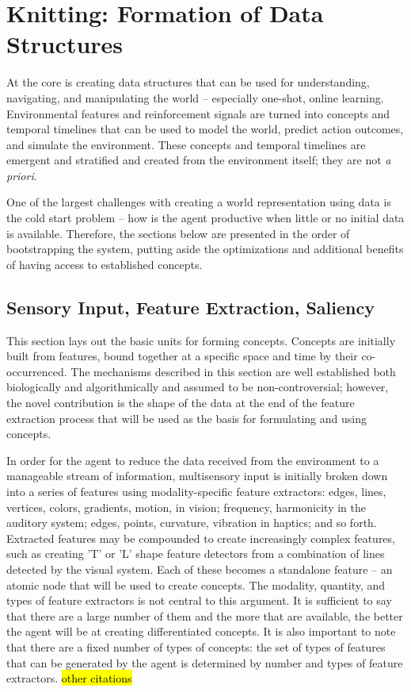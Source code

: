 \documentclass{article}
\begin{document}
\section{Knitting: Formation of Data Structures}
At the core is creating data structures that can be used for understanding, navigating, and manipulating the world -- especially one-shot, online learning. Environmental features and reinforcement signals are turned into concepts and temporal timelines that can be used to model the world, predict action outcomes, and simulate the environment. These concepts and temporal timelines are emergent and stratified and created from the environment itself; they are not \emph{a priori}.

One of the largest challenges with creating a world representation using data is the cold start problem -- how is the agent productive when little or no initial data is available. Therefore, the sections below are presented in the order of bootstrapping the system, putting aside the optimizations and additional benefits of having access to established concepts.

\subsection{Sensory Input, Feature Extraction, Saliency}
This section lays out the basic units for forming concepts. Concepts are initially built from features, bound together at a specific space and time by their co-occurrenced. The mechanisms described in this section are well established both biologically and algorithmically and assumed to be non-controversial; however, the novel contribution is the shape of the data at the end of the feature extraction process that will be used as the basis for formulating and using concepts.

In order for the agent to reduce the data received from the environment to a manageable stream of information, multisensory input is initially broken down into a series of features using modality-specific feature extractors: edges, lines, vertices, colors, gradients, motion, in vision; frequency, harmonicity in the auditory system; edges, points, curvature, vibration in haptics; and so forth. Extracted features may be compounded to create increasingly complex features, such as creating 'T' or 'L' shape feature detectors from a combination of lines detected by the visual system. Each of these becomes a standalone feature -- an atomic node that will be used to create concepts. The modality, quantity, and types of feature extractors is not central to this argument. It is sufficient to say that there are a large number of them and the more that are available, the better the agent will be at creating differentiated concepts. It is also important to note that there are a fixed number of types of concepts: the set of types of features that can be generated by the agent is determined by number and types of feature extractors. \citep{pashler_attention_2016} \hl{other citations}
\end{document}
